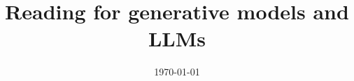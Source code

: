 \documentclass[letterpaper,11pt,reqno]{amsart}
\begin{document}
\title{Reading for generative models and LLMs}
\date{\today}
\maketitle

\cite{brown2020language,bender2021dangers,frieder2024mathematical,
    rombach2022high,longpre2023flan,radford2019language,zhang2023multimodal,
    friston2024designing,hu2021lora,ruiz2023dreambooth,touvron2023llama,
    gao2020pile,zhang2023adding,hsieh2023distilling,pryzant2023automatic,
    sun2023pearl,jiang2023mistral,murthy2023rex,zhang2023survey,
    lewis2020retrieval,cai2022recent,parvez2021retrieval,park2015speclda,
    hinton1995wake,pouplin2024retrieval,he2024g,wang2022self,
    yuan2024selfrewarding,liu2023instaflow,zhou2023algorithms}



\end{document}
